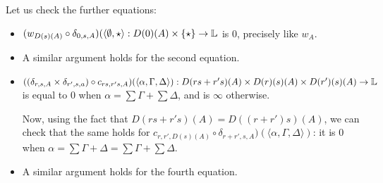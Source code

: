 Let us check the further equations:
\begin{itemize}

\item $(w_{D(s)(A)}\circ \delta_{0,s,A})(\langle \emptyset,\star\rangle: D(0)(A)\times \{\star\}\to \mathbb{L}$ is 0, precisely like $w_{A}$.

\item A similar argument holds for the second equation.

\item $((\delta_{r,s,A}\times \delta_{r',s,a})\circ c_{rs,r's,A})
(\langle \alpha, \Gamma,\Delta  \rangle)
:
D(rs+r's)(A)\times  D(r)(s)(A)\times D(r')(s)(A)\to \mathbb{L}
$
is equal to $0$ when $\alpha=\sum \Gamma + \sum \Delta$, and is $\infty$ otherwise.



Now, 
using the fact that $D(rs+r's)(A)=D((r+r')s)(A)$, we can check that the same holds for 
$c_{r,r',D(s)(A)}\circ \delta_{r+r',s,A})(\langle \alpha, \Gamma,\Delta  \rangle)$: it is $0$ when 
$\alpha= \sum\Gamma+\Delta= \sum \Gamma+\sum \Delta$.


\item A similar argument holds for the fourth equation.

\end{itemize}

